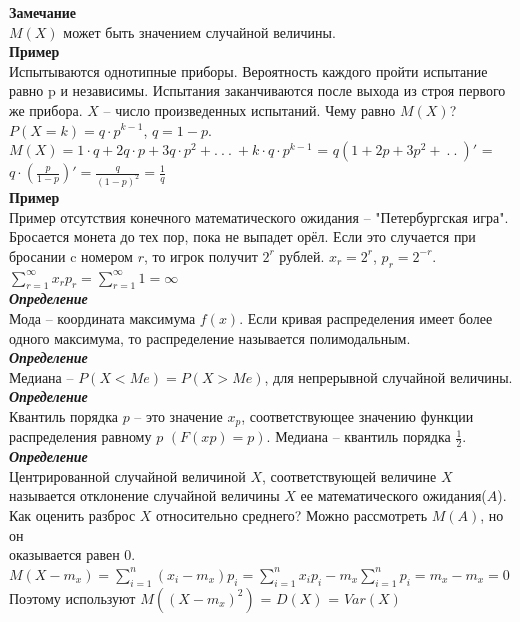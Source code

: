 \documentclass[russian, 12pt, fleqn]{article}
\begin{document}
\textbf{Замечание\ } \\
$M(X)$ может быть значением случайной величины.\\
\textbf{Пример\ }\\
Испытываются однотипные приборы. Вероятность каждого пройти испытание равно p и независимы. Испытания заканчиваются после выхода из строя первого же прибора. $X$ -- число произведенных испытаний. Чему равно $M(X)$?\\
$P(X=k) = q\cdot p ^{k - 1}$, $q = 1 - p$.\\
$M(X) = 1\cdot q + 2q\cdot p + 3 q \cdot p^2 + .\ .\ .\ +k\cdot q\cdot p^{k-1}$ = $q(1+2p+3p^2 + \ .\ .\ )'$ = $q\cdot(\frac{p}{1-p}) ' = \frac{q}{{(1-p)}^2} = \frac{1}{q}$\\
\textbf{Пример\ }\\
 Пример отсутствия конечного математического ожидания -- "Петербургская игра". Бросается монета до тех пор, пока не выпадет орёл. Если это случается при бросании c номером $r$, то игрок получит $2^r$ рублей. $x_r=2^r$, $p_r=2^{-r}$.\\ $\sum\limits_{r = 1}^{\infty}  x_rp_r = \sum\limits_{r = 1}^{\infty} 1 = \infty$\\
\textit{\textbf{Определение}}\\
Мода -- координата максимума $f(x)$. Если кривая распределения имеет более одного максимума, то распределение называется полимодальным.\\
\textit{\textbf{Определение}}\\
Медиана -- $P(X<Me) = P(X>Me)$, для непрерывной случайной величины.\\
\textit{\textbf{Определение}}\\
Квантиль порядка $p$ -- это значение $x_p$, соответствующее значению функции распределения равному $p$ $(F(xp)=p)$. Медиана -- квантиль порядка $\frac{1}{2}$.\\
\textit{\textbf{Определение}}\\
Центрированной случайной величиной $X$, соответствующей величине $X$ называется отклонение случайной величины $X$ ее математического ожидания($A$).
Как оценить разброс $X$ относительно среднего? Можно рассмотреть $M(A)$, но он\\ оказывается равен 0.\\
$M(X - m_x) = \sum\limits_{i=1}^{n}(x_i-m_x)p_i=\sum\limits_{i=1}^{n}x_ip_i - m_x\sum\limits_{i=1}^{n}p_i = m_x - m_x = 0$\\
Поэтому используют $M((X-m_x)^2)$ = $D(X)$ = $Var(X)$\\
\end{document}
